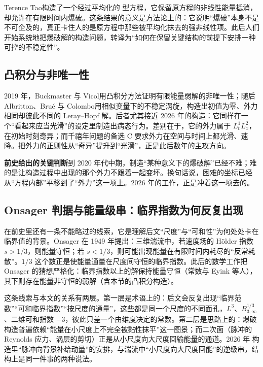 Terence Tao\cite{tao-averaged}构造了一个经过平均化的 \NS{} 型方程，它保留原方程的非线性能量抵消，却允许在有限时间内爆破。这条结果的意义是方法论上的：它说明“爆破”本身不是不可企及的，真正卡住人的是原方程中那些被平均化抹去的强非线性项。此后人们开始系统地把爆破解的构造问题，转译为“如何在保留关键结构的前提下安排一种可控的不稳定性”。

\subsection{凸积分与非唯一性}

2019 年，Buckmaster 与 Vicol\cite{bv-nonunique}用凸积分方法证明有限能量弱解的非唯一性；随后 Albritton、Brué 与 Colombo\cite{abc}用相似变量下的不稳定涡旋，构造出初值为零、外力相同却彼此不同的 Leray--Hopf 解。后者尤其接近 2026 年的构造：它同样在一个“看起来应当光滑”的设定里制造出病态行为。差别在于，它的外力属于 $L_{t}^{1}L_{x}^{2}$，在初始时刻奇异；而千禧年问题的备选 C 要求外力在空间与时间上都光滑、速降。把外力的正则性从“奇异”提升到“光滑”，正是此后数年的主攻方向。

\begin{keybox}
\textbf{前史给出的关键判断}\quad 到 2020 年代中期，制造“某种意义下的爆破解”已经不难；难的是让构造过程中出现的那个外力不跟着一起变坏。换句话说，困难的坐标已经从“方程内部”平移到了“外力”这一项上。2026 年的工作，正是冲着这一项去的。
\end{keybox}

\subsection{Onsager 判据与能量级串：临界指数为何反复出现}

在前史里还有一条不能略过的线索，它是理解后文“尺度”与“可和性”为何处处卡在临界值的背景。Onsager 在 1949 年提出：三维湍流中，若速度场的 Hölder 指数 $s>1/3$，则能量守恒；若 $s<1/3$，则可能出现能量在有限时间内耗尽的“反常耗散”。$1/3$ 这个数正是使能量通量在尺度间守恒的临界指数。此后的数学工作把 Onsager 的猜想严格化：临界指数以上的解保持能量守恒（常数与 Eyink 等人），其下则存在能量非守恒的弱解（含本节的凸积分构造）。

这条线索与本文的关系有两层。第一层是术语上的：后文会反复出现“临界范数”“可和临界指数”“按尺度的通量”，这些都是同一个尺度的不同面孔，$L^{3}$、$B^{1/3}_{3,\infty}$、二维可和指数 $-3$，彼此只差一个由维度决定的常数。第二层是思路上的：爆破构造普遍依赖“能量在小尺度上不完全被黏性抹平”这一图景；而二次面（脉冲的 Reynolds 应力、涡层的剪切）正是从小尺度向大尺度回输能量的通道。2026 年 \NS{} 构造里“脉冲向背景补给动量”的安排，与湍流中“小尺度向大尺度回能”的逆级串，结构上是同一件事的两种说法。

